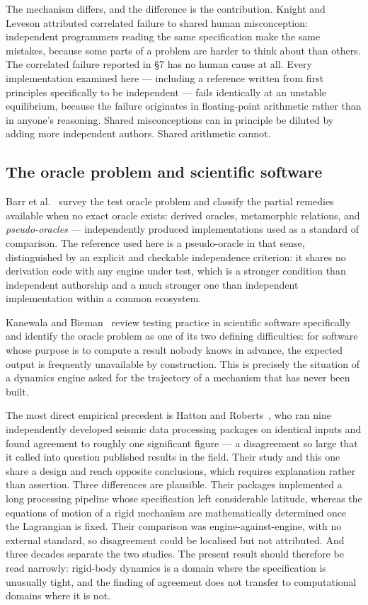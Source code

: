 \documentclass[review,12pt]{elsarticle}
\begin{document}
The mechanism differs, and the difference is the contribution. Knight and Leveson
attributed correlated failure to shared human misconception: independent
programmers reading the same specification make the same mistakes, because some
parts of a problem are harder to think about than others. The correlated failure
reported in \S7 has no human cause at all. Every implementation examined here ---
including a reference written from first principles specifically to be
independent --- fails identically at an unstable equilibrium, because the failure
originates in floating-point arithmetic rather than in anyone's reasoning. Shared
misconceptions can in principle be diluted by adding more independent authors.
Shared arithmetic cannot.

\subsection{The oracle problem and scientific software}
Barr et al.~\cite{barr2015} survey the test oracle problem and classify the
partial remedies available when no exact oracle exists: derived oracles,
metamorphic relations, and \emph{pseudo-oracles} --- independently produced
implementations used as a standard of comparison. The reference used here is a
pseudo-oracle in that sense, distinguished by an explicit and checkable
independence criterion: it shares no derivation code with any engine under test,
which is
a stronger condition than independent authorship and a much stronger one than
independent implementation within a common ecosystem.

Kanewala and Bieman~\cite{kanewala2014} review testing practice in scientific
software specifically and identify the oracle problem as one of its two defining
difficulties: for software whose purpose is to compute a result nobody knows in
advance, the expected output is frequently unavailable by construction. This is
precisely the situation of a dynamics engine asked for the trajectory of a
mechanism that has never been built.

The most direct empirical precedent is Hatton and Roberts~\cite{hatton1994}, who
ran nine independently developed seismic data processing packages on identical
inputs and found agreement to roughly one significant figure --- a disagreement
so large that it called into question published results in the field. Their study
and this one share a design and reach opposite conclusions, which requires
explanation rather than assertion. Three differences are plausible. Their
packages implemented a long processing pipeline whose specification left
considerable latitude, whereas the equations of motion of a rigid mechanism are
mathematically determined once the Lagrangian is fixed. Their comparison was
engine-against-engine, with no external standard, so disagreement could be
localised but not attributed. And three decades separate the two studies. The
present result should therefore be read narrowly: rigid-body dynamics is a domain
where the specification is unusually tight, and the finding of agreement does not
transfer to computational domains where it is not.
\end{document}
